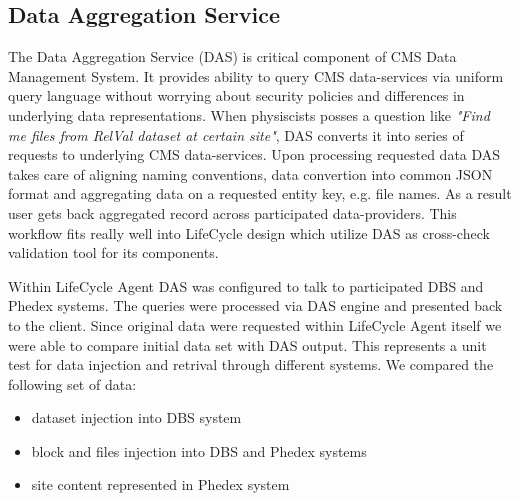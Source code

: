\subsection{Data Aggregation Service}
The Data Aggregation Service (DAS) \cite{DAS} is critical component of CMS Data
Management System. It provides ability to query CMS data-services via uniform
query language without worrying about security policies and differences in
underlying data representations. When physiscists posses a question like {\it
"Find me files from RelVal dataset at certain site"}, DAS converts it into
series of requests to underlying CMS data-services. Upon processing requested
data DAS takes care of aligning naming conventions, data convertion into common
JSON format and aggregating data on a requested entity key, e.g. file names.
As a result user gets back aggregated record across participated
data-providers.  This workflow fits really well into LifeCycle design which
utilize DAS as cross-check validation tool for its components.

Within LifeCycle Agent DAS was configured to talk to participated DBS and
Phedex systems. The queries were processed via DAS engine and presented back
to the client. Since original data were requested within LifeCycle Agent itself
we were able to compare initial data set with DAS output. This represents a
unit test for data injection and retrival through different systems. We
compared the following set of data:

\begin{itemize}
\item dataset injection into DBS system
\item block and files injection into DBS and Phedex systems
\item site content represented in Phedex system
\end{itemize}

